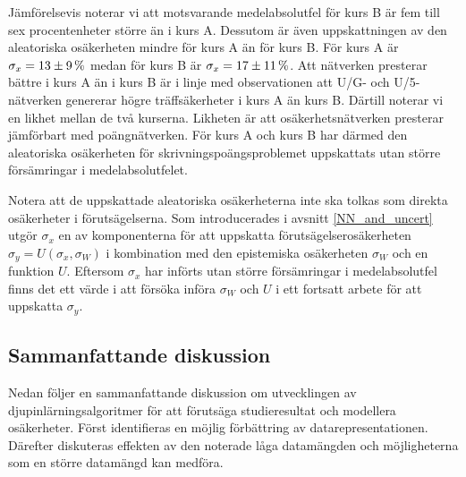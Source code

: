 Jämförelsevis noterar vi att motsvarande medelabsolutfel för kurs B är fem till sex procentenheter större än i kurs A. Dessutom är även uppskattningen av den aleatoriska osäkerheten mindre för kurs A än för kurs B. För kurs A är $\sigma_x = 13 \pm 9\,\rm \%$ medan för kurs B är $\sigma_x = 17 \pm 11 \,\rm \%$. Att nätverken presterar bättre i kurs A än i kurs B är i linje med observationen att U/G- och U/5-nätverken genererar högre träffsäkerheter i kurs A än kurs B. Därtill noterar vi en likhet mellan de två kurserna. Likheten är att osäkerhetsnätverken presterar jämförbart med poängnätverken. För kurs A och kurs B har därmed den aleatoriska osäkerheten för skrivningspoängsproblemet uppskattats utan större försämringar i medelabsolutfelet.

Notera att de uppskattade aleatoriska osäkerheterna inte ska tolkas som direkta osäkerheter i förutsägelserna. Som introducerades i avsnitt \ref{NN_and_uncert} utgör $\sigma_x$ en av komponenterna för att uppskatta förutsägelserosäkerheten $\sigma_y = U(\sigma_x, \sigma_W)$ i kombination med den epistemiska osäkerheten $\sigma_W$ och en funktion $U$. Eftersom $\sigma_x$ har införts utan större försämringar i medelabsolutfel finns det ett värde i att försöka införa $\sigma_W$ och $U$ i ett fortsatt arbete för att uppskatta $\sigma_y$.





\subsection{Sammanfattande diskussion}
\label{sec:Deep-D}
Nedan följer en sammanfattande diskussion om utvecklingen av djupinlärningsalgoritmer för att förutsäga studieresultat och modellera osäkerheter. Först identifieras en möjlig förbättring av datarepresentationen. Därefter diskuteras effekten av den noterade låga datamängden och möjligheterna som en större datamängd kan medföra. 

